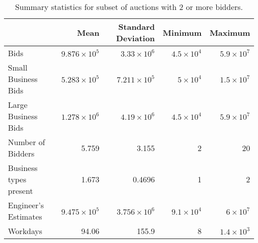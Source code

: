 \begin{table}[ht]
\centering
\begin{tabular}{lrrrr}
  \toprule
 & Mean & Standard Deviation & Minimum & Maximum \\ 
  \midrule
Bids & $9.876 \times 10^{5}$ & $3.33 \times 10^{6}$ & $4.5 \times 10^{4}$ & $5.9 \times 10^{7}$ \\ 
  Small Business Bids & $5.283 \times 10^{5}$ & $7.211 \times 10^{5}$ & $5 \times 10^{4}$ & $1.5 \times 10^{7}$ \\ 
  Large Business Bids & $1.278 \times 10^{6}$ & $4.19 \times 10^{6}$ & $4.5 \times 10^{4}$ & $5.9 \times 10^{7}$ \\ 
  Number of Bidders & 5.759 & 3.155 &   2 &  20 \\ 
  Business types present & 1.673 & 0.4696 &   1 &   2 \\ 
  Engineer's Estimates & $9.475 \times 10^{5}$ & $3.756 \times 10^{6}$ & $9.1 \times 10^{4}$ & $6 \times 10^{7}$ \\ 
  Workdays & 94.06 & 155.9 &   8 & $1.4 \times 10^{3}$ \\ 
   \bottomrule
\end{tabular}
\caption{Summary statistics for subset of auctions with 2 or more bidders.} 
\end{table}
